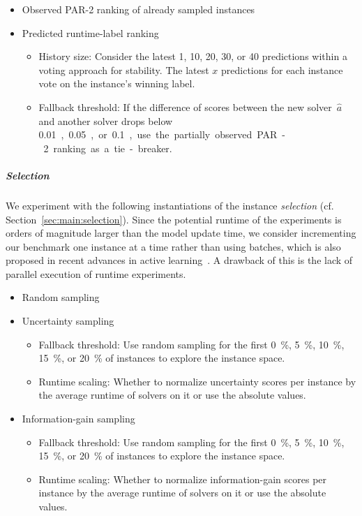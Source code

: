 \documentclass[sn-basic, Numbered]{sn-jnl} %
\begin{document}
\begin{itemize}\setlength{\itemsep}{1pt}
  \item Observed PAR-2 ranking of already sampled instances
  \item Predicted runtime-label ranking
  \vspace*{-1ex}
  \begin{itemize}\setlength{\itemsep}{1pt}
    \item
    History size: Consider the latest 1, 10, 20, 30, or 40 predictions within a voting approach for stability.
    The latest $x$ predictions for each instance vote on the instance's winning label.
    \item
    Fallback threshold: If the difference of scores between the new solver~$\hat{a}$ and another solver drops below \SI{0.01}, \SI{0.05}, or \SI{0.1}, use the partially observed PAR-2 ranking as a tie-breaker.
  \end{itemize}
\end{itemize}

\subparagraph{Selection}

We experiment with the following instantiations of the instance \emph{selection} (cf. Section~\ref{sec:main:selection}).
Since the potential runtime of the experiments is orders of magnitude larger than the model update time, we consider incrementing our benchmark one instance at a time rather than using batches, which is also proposed in recent advances in active learning~\cite{SinhaED19,2019gaal}.
A drawback of this is the lack of parallel execution of runtime experiments.

\begin{itemize}\setlength{\itemsep}{1pt}
  \item Random sampling 
  \item Uncertainty sampling
  \vspace*{-1ex}
  \begin{itemize}\setlength{\itemsep}{1pt}
    \item Fallback threshold: Use random sampling for the first \SI{0}{\%}, \SI{5}{\%}, \SI{10}{\%}, \SI{15}{\%}, or \SI{20}{\%} of instances to explore the instance space.
    \item Runtime scaling: Whether to normalize uncertainty scores per instance by the average runtime of solvers on it or use the absolute values.
  \end{itemize}

  \item Information-gain sampling
  \vspace*{-1ex}
  \begin{itemize}
    \item Fallback threshold: Use random sampling for the first \SI{0}{\%}, \SI{5}{\%}, \SI{10}{\%}, \SI{15}{\%}, or \SI{20}{\%} of instances to explore the instance space.
    \item Runtime scaling: Whether to normalize information-gain scores per instance by the average runtime of solvers on it or use the absolute values.
  \end{itemize}
\end{itemize}
\end{document}
